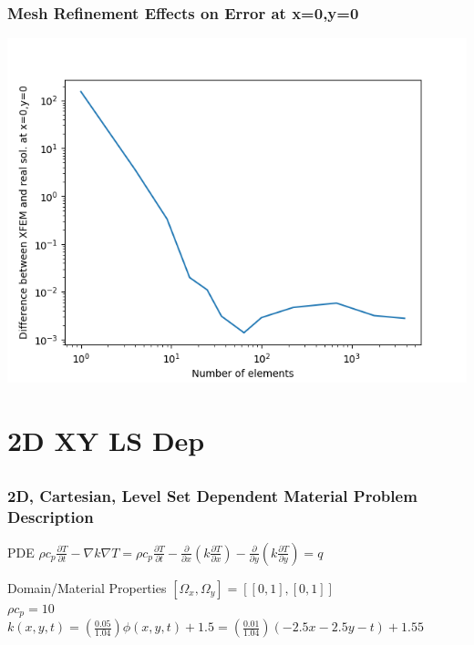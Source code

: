 \documentclass[]{beamer}
\begin{document}
\begin{frame}[t]\frametitle{Mesh Refinement Effects on Error at x=0,y=0}
	\begin{center}
		\includegraphics[scale=0.5]{figures/2D_xy_h1m/2D_xy_homog1mat_neumann_comp}
	\end{center}
\end{frame}

\section{2D XY LS Dep}
\subsection{}
\begin{frame}[t]\frametitle{2D, Cartesian, Level Set Dependent Material Problem Description}
  \begin{block}{PDE}
    $\rho c_p\frac{\partial T}{\partial t} - \nabla k \nabla T = 
    \rho c_p\frac{\partial T}{\partial t} - \frac{\partial}{\partial x}
    \left(k\frac{\partial T}{\partial x}\right) - \frac{\partial}{\partial y}
    \left(k\frac{\partial T}{\partial y}\right)= q$
  \end{block}
  
  \begin{block}{Domain/Material Properties}
  	$[\Omega_x,\Omega_y] = [[0,1],[0,1]]$ \\
  	$\rho c_p = 10$ \\
  	$k(x,y,t) = \left(\frac{0.05}{1.04} \right)\phi(x,y,t) +1.5 = \left(\frac{0.01}{1.04}\right)
  	(-2.5x - 2.5y - t) + 1.55$
  \end{block}
\end{frame}
  
\end{document}
